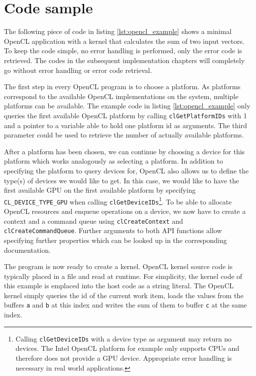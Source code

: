 \section{Code sample}
\label{sec:code_sample}

The following piece of code in listing \ref{lst:opencl_example} shows a minimal OpenCL application with a kernel that calculates the sum of two input vectors. To keep the code simple, no error handling is performed, only the error code is retrieved. The codes in the subsequent implementation chapters will completely go without error handling or error code retrieval.



The first step in every OpenCL program is to choose a platform. As platforms correspond to the available OpenCL implementations on the system, multiple platforms can be available. The example code in listing \ref{lst:opencl_example} only queries the first available OpenCL platform by calling \lstinline!clGetPlatformIDs! with 1 and a pointer to a variable able to hold one platform id as arguments. The third parameter could be used to retrieve the number of actually available platforms.

After a platform has been chosen, we can continue by choosing a device for this platform which works analogously as selecting a platform. In addition to specifying the platform to query devices for, OpenCL also allows us to define the type(s) of devices we would like to get. In this case, we would like to have the first available GPU on the first available platform by specifying \lstinline!CL_DEVICE_TYPE_GPU! when calling \lstinline!clGetDeviceIDs!\footnote{Calling \lstinline!clGetDeviceIDs! with a device type as argument may return no devices. The Intel OpenCL platform for example only supports CPUs and therefore does not provide a GPU device. Appropriate error handling is necessary in real world applications.}. To be able to allocate OpenCL resources and enqueue operations on a device, we now have to create a context and a command queue using \lstinline!clCreateContext! and \lstinline!clCreateCommandQueue!. Further arguments to both API functions allow specifying further properties which can be looked up in the corresponding documentation.

The program is now ready to create a kernel. OpenCL kernel source code is typically placed in a file and read at runtime. For simplicity, the kernel code of this example is emplaced into the host code as a string literal. The OpenCL kernel simply queries the id of the current work item, loads the values from the buffers \lstinline!a! and \lstinline!b! at this index and writes the sum of them to buffer \lstinline!c! at the same index.

